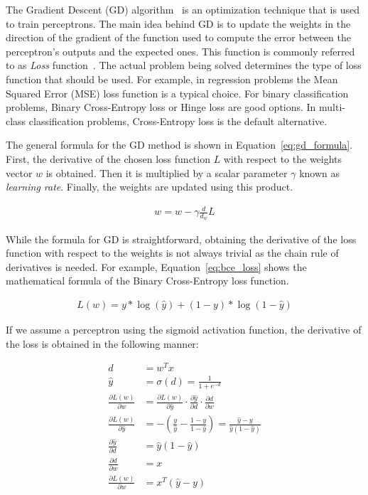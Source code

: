 The Gradient Descent (GD) algorithm~\cite{gradient_descent} is an optimization technique that is used to
train perceptrons. The main idea behind GD is to update the weights in the
direction of the gradient of the function used to compute the error between the
perceptron's outputs and the expected ones. This function is commonly referred
to as \textit{Loss} function~\cite{loss_functions}. The actual problem being solved determines the
type of loss function that should be used. For example, in regression problems
the Mean Squared Error (MSE) loss function is a typical choice. For binary
classification problems, Binary Cross-Entropy loss or Hinge loss are good
options. In multi-class classification problems, Cross-Entropy loss is the
default alternative.

The general formula for the GD method is shown in Equation~\ref{eq:gd_formula}. First, the derivative of the chosen loss function $L$ with respect to the weights vector $w$ is obtained. Then it is multiplied by a scalar parameter $\gamma$ known as \textit{learning rate}. Finally, the weights are updated using this product.

\begin{align}
    w = w - \gamma \frac{d}{d_w}L
    \label{eq:gd_formula}
\end{align}

While the formula for GD is straightforward, obtaining the derivative of the
loss function with respect to the weights is not always trivial as the chain
rule of derivatives is needed. For example, Equation~\ref{eq:bce_loss} shows the
mathematical formula of the Binary Cross-Entropy loss function.

\begin{align}
    L(w) = y * \log(\hat{y}) + (1 - y) * \log(1 - \hat{y})
    \label{eq:bce_loss}
\end{align}

If we assume a perceptron using the sigmoid activation function, the derivative
of the loss is obtained in the following manner:

\begin{align}
    d &= w^T x \\
    \hat{y} &= \sigma(d) = \frac{1}{1 + e^{-d}} \\
    \frac{\partial L(w)}{\partial w} &= \frac{\partial L(w)}{\partial \hat{y}} \cdot \frac{\partial \hat{y}}{\partial d} \cdot \frac{\partial d}{\partial w}\\
    \frac{\partial L(w)}{\partial \hat{y}} &= -\left(\frac{y}{\hat{y}} - \frac{1
    - y}{1 - \hat{y}}\right) = \frac{\hat{y} - y}{\hat{y}(1-\hat{y})} \\
    \frac{\partial \hat{y}}{\partial d} &= \hat{y}(1 - \hat{y}) \\
    \frac{\partial d}{\partial w} &= x \\
    \frac{\partial L(w)}{\partial w} &= x^T(\hat{y}-y)
\end{align}

